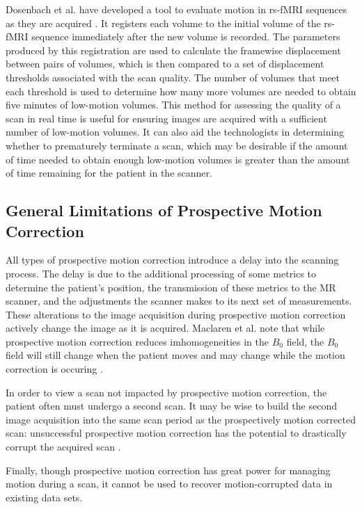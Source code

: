 Dosenbach et al. have developed a tool to evaluate motion in rs-fMRI sequences as they are acquired \cite{Dosenbach2017}. It registers each volume to the initial volume of the rs-fMRI sequence immediately after the new volume is recorded. The parameters produced by this registration are used to calculate the framewise displacement between pairs of volumes, which is then compared to a set of displacement thresholds associated with the scan quality. The number of volumes that meet each threshold is used to determine how many more volumes are needed to obtain five minutes of low-motion volumes. This method for assessing the quality of a scan in real time is useful for ensuring images are acquired with a sufficient number of low-motion volumes. It can also aid the technologists in determining whether to prematurely terminate a scan, which may be desirable if the amount of time needed to obtain enough low-motion volumes is greater than the amount of time remaining for the patient in the scanner. 


\subsection{General Limitations of Prospective Motion Correction}

All types of prospective motion correction introduce a delay into the scanning process. The delay is due to the additional processing of some metrics to determine the patient's position, the transmission of these metrics to the MR scanner, and the adjustments the scanner makes to its next set of measurements. These alterations to the image acquisition during prospective motion correction actively change the image as it is acquired.
Maclaren et al. note that while prospective motion correction reduces imhomogeneities in the $B_0$ field, the $B_0$ field will still change when the patient moves and may change while the motion correction is occuring \cite{Maclaren2013}. %

In order to view a scan not impacted by prospective motion correction, the patient often must undergo a second scan. It may be wise to build the second image acquisition into the same scan period as the prospectively motion corrected scan: unsuccessful prospective motion correction has the potential to drastically corrupt the acquired scan \cite{Zaitsev2017}.

Finally, though prospective motion correction has great power for managing motion during a scan, it cannot be used to recover motion-corrupted data in existing data sets.


